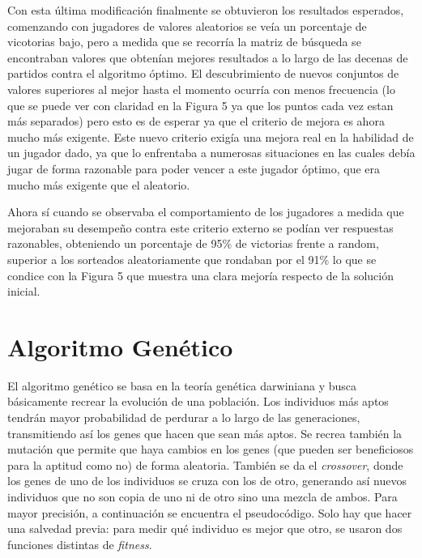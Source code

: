 \documentclass[A4paper,oneside,fleqn,11pt]{article}
\theoremstyle{definition}
\begin{document}
Con esta última modificación finalmente se obtuvieron los resultados esperados, comenzando con jugadores de valores aleatorios se veía un porcentaje de vicotorias bajo, pero a medida que se recorría la matriz de búsqueda se encontraban valores que obtenían mejores resultados a lo largo de las decenas de partidos contra el algoritmo óptimo. El descubrimiento de nuevos conjuntos de valores superiores al mejor hasta el momento ocurría con menos frecuencia (lo que se puede ver con claridad en la Figura 5 ya que los puntos cada vez estan más separados) pero esto es de esperar ya que el criterio de mejora es ahora mucho más exigente. Este nuevo criterio exigía una mejora real en la habilidad de un jugador dado, ya que lo enfrentaba a numerosas situaciones en las cuales debía jugar de forma razonable para poder vencer a este jugador óptimo, que era mucho más exigente que el aleatorio. 


Ahora sí cuando se observaba el comportamiento de los jugadores a medida que mejoraban su desempeño contra este criterio externo se podían ver respuestas razonables, obteniendo un porcentaje de 95\% de victorias frente a random, superior a los sorteados aleatoriamente que rondaban por el 91\% lo que se condice con la Figura 5 que muestra una clara mejoría respecto de la solución inicial.


\section{Algoritmo Genético}

El algoritmo genético se basa en la teoría genética darwiniana y busca básicamente recrear la evolución de una población. Los individuos más aptos tendrán mayor probabilidad de perdurar a lo largo de las generaciones, transmitiendo así los genes que hacen que sean más aptos. Se recrea también la mutación que permite que haya cambios en los genes (que pueden ser beneficiosos para la aptitud como no) de forma aleatoria. También se da el \textit{crossover}, donde los genes de uno de los individuos se cruza con los de otro, generando así nuevos individuos que no son copia de uno ni de otro sino una mezcla de ambos. Para mayor precisión, a continuación se encuentra el pseudocódigo. Solo hay que hacer una salvedad previa: para medir qué individuo es mejor que otro, se usaron dos funciones distintas de \textit{fitness}.
\end{document}
